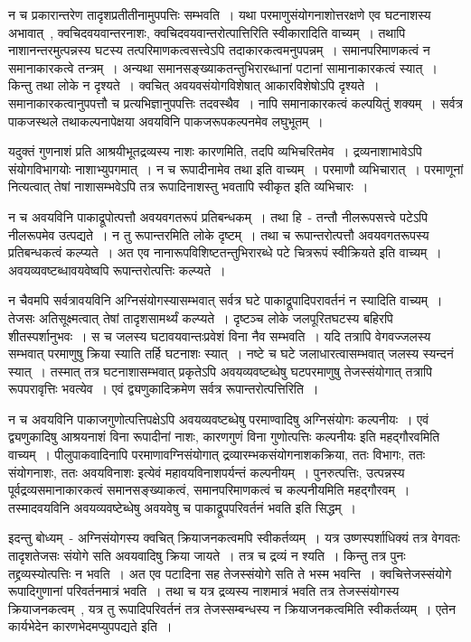 		न च प्रकारान्तरेण तादृशप्रतीतीनामुपपत्तिः सम्भवति~। यथा परमाणुसंयोगनाशोत्तरक्षणे एव घटनाशस्य अभावात्~, क्वचिदवयवान्तरनाशः, क्वचिदवयवान्तरोत्पात्तिरिति स्वीकारादिति वाच्यम्~। तथापि नाशानन्तरमुत्पन्नस्य घटस्य तत्परिमाणकत्वसत्त्वेऽपि तदाकारकत्वमनुपपन्नम्~। समानपरिमाणकत्वं न समानाकारकत्वे तन्त्रम्~। अन्यथा समानसङ्ख्याकतन्तुभिरारब्धानां पटानां सामानाकारकत्वं स्यात्~। किन्तु तथा लोके न दृश्यते~। क्वचित् अवयवसंयोगविशेषात् आकारविशेषोऽपि दृश्यते~। समानाकारकत्वानुपपत्तौ च प्रत्यभिज्ञानुपपत्तिः तदवस्थैव~। नापि समानाकारकत्वं कल्पयितुं शक्यम्~। सर्वत्र पाकजस्थले तथाकल्पनापेक्षया अवयविनि पाकजरूपकल्पनमेव लघुभूतम्~।

		यदुक्तं गुणनाशं प्रति आश्रयीभूतद्रव्यस्य नाशः‌ कारणमिति, तदपि व्यभिचरितमेव~। द्रव्यनाशाभावेऽपि संयोगविभागयोः नाशाभ्युपगमात्~। न च रूपादीनामेव तथा इति वाच्यम्~। परमाणौ व्यभिचारात्~।‌ परमाणूनां नित्यत्वात् तेषां नाशासम्भवेऽपि तत्र रूपादिनाशस्तु भवतापि स्वीकृत इति व्यभिचारः~। 

		न च अवयविनि पाकाद्रूपोत्पत्तौ अवयवगतरूपं प्रतिबन्धकम्~। तथा हि~- तन्तौ नीलरूपसत्त्वे पटेऽपि नीलरूपमेव उत्पद्यते~। न तु रूपान्तरमिति लोके दृष्टम्~। तथा च रूपान्तरोत्पत्तौ अवयवगतरूपस्य प्रतिबन्धकत्वं कल्प्यते~। अत एव नानारूपविशिष्टतन्तुभिरारब्धे पटे चित्ररूपं स्वीक्रियते इति वाच्यम्~। अवयव्यवष्टब्धावयवेष्वपि रूपान्तरोत्पत्तिः कल्प्यते~। 

		न चैवमपि सर्वत्रावयविनि अग्निसंयोगस्यासम्भवात् सर्वत्र घटे पाकाद्रूपादिपरावर्तनं न स्यादिति वाच्यम्~। तेजसः अतिसूक्ष्मत्वात् तेषां तादृशसामर्थ्यं कल्प्यते~।‌ दृष्टञ्च लोके जलपूरितघटस्य बहिरपि शीतस्पर्शानुभवः~। स च जलस्य घटावयवान्तःप्रवेशं विना नैव सम्भवति~। यदि तत्रापि वेगवज्जलस्य सम्भवात् परमाणुषु क्रिया स्याति तर्हि घटनाशः स्यात्~। नष्टे च घटे जलाधारत्वासम्भवात् जलस्य स्यन्दनं स्यात्~। तस्मात् तत्र घटनाशासम्भवात् प्रकृतेऽपि अवयव्यवष्टब्धेषु घटपरमाणुषु तेजस्संयोगात् तत्रापि रूपपरावृत्तिः भवत्येव~।‌ एवं द्व्यणुकादिक्रमेण सर्वत्र रूपान्तरोत्पत्तिरिति~।

		न च अवयविनि पाकाजगुणोत्पत्तिपक्षेऽपि  अवयव्यवष्टब्धेषु परमाण्वादिषु अग्निसंयोगः कल्पनीयः~। एवं द्व्यणुकादिषु आश्रयनाशं विना रूपादीनां नाशः, कारणगुणं विना गुणोत्पत्तिः कल्पनीयः इति महद्गौरवमिति वाच्यम्~। पीलुपाकवादिनापि परमाणावग्निसंयोगात् द्रव्यारम्भकसंयोगनाशकक्रिया, ततः विभागः, ततः संयोगनाशः, ततः अवयविनाशः इत्येवं महावयविनाशपर्यन्तं कल्पनीयम्~। पुनरुत्पत्तिः, उत्पन्नस्य पूर्वद्रव्यसमानाकारकत्वं समानसङ्ख्याकत्वं, समानपरिमाणकत्वं च कल्पनीयमिति महद्गौरवम्~। तस्मादवयविनि अवयव्यवष्टेब्धेषु अवयवेषु च पाकाद्रूपपरिवर्तनं भवति इति सिद्धम्~।

		इदन्तु बोध्यम्~- अग्निसंयोगस्य क्वचित् क्रियाजनकत्वमपि स्वीकर्तव्यम्~। यत्र उष्णस्पर्शाधिक्यं तत्र वेगवतः तादृशतेजसः संयोगे सति अवयवादिषु क्रिया जायते~। तत्र च द्रव्यं न श्यति~। किन्तु तत्र पुनः तद्द्रव्यस्योत्पत्तिः न भवति~। अत एव पटादिना सह तेजस्संयोगे सति ते भस्म भवन्ति~। क्वचित्तेजस्संयोगे रूपादिगुणानां परिवर्तनमात्रं भवति~। तथा च यत्र द्रव्यस्य नाशमात्रं भवति तत्र तेजस्संयोगस्य क्रियाजनकत्वम्~, यत्र तु रूपादिपरिवर्तनं तत्र तेजस्सम्बन्धस्य  न क्रियाजनकत्वमिति स्वीकर्तव्यम्~। एतेन कार्यभेदेन कारणभेदमप्युपपद्यते इति~।

